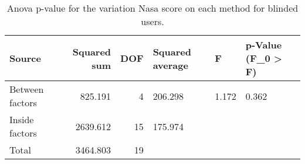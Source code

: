 
\begin{table}[!htb]
\centering
\caption{Anova p-value for the variation Nasa score on each method for blinded users.}
\label{tab:anova_nasa_var}
\begin{tabular}{lrrlll}
\toprule
         Source &  Squared sum &  DOF & Squared average &     F & p-Value (F\_0 > F) \\
\midrule
Between factors &      825.191 &    4 &         206.298 & 1.172 &             0.362 \\
 Inside factors &     2639.612 &   15 &         175.974 &       &                   \\
          Total &     3464.803 &   19 &                 &       &                   \\
\bottomrule
\end{tabular}
\end{table}

